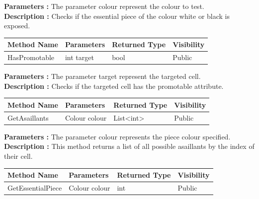 \documentclass[12pt]{article}
\begin{document}
\textbf{Parameters :} The parameter colour represent the colour
to test.
\\

\textbf{Description :} Checks if the essential piece of the colour white or black
is exposed.

\begin{table}[H]
    \begin{tabular}{|l|l|l|l|}
    \hline
    \rowcolor[HTML]{EFEFEF} 
    \cellcolor[HTML]{EFEFEF}\textbf{Method Name} & \textbf{Parameters}     & \textbf{Returned Type} & \textbf{Visibility} \\ \hline
    HasPromotable                                & int target              & bool                   & Public              \\ \hline
    \end{tabular}
\end{table}

\textbf{Parameters :} The parameter target represent the targeted cell.
\\

\textbf{Description :} Checks if the targeted cell has the promotable attribute.

\begin{table}[H]
    \begin{tabular}{|l|l|l|l|}
    \hline
    \rowcolor[HTML]{EFEFEF} 
    \cellcolor[HTML]{EFEFEF}\textbf{Method Name} & \textbf{Parameters}     & \textbf{Returned Type} & \textbf{Visibility} \\ \hline
    GetAsaillants                                & Colour colour           & List<int>                   & Public              \\ \hline
    \end{tabular}
\end{table}

\textbf{Parameters :} The parameter colour represents the piece colour specified.
\textbf{Description :} This method returns a list of all possible asaillants by the index of their cell.

\begin{table}[H]
    \begin{tabular}{|l|l|l|l|}
    \hline
    \rowcolor[HTML]{EFEFEF} 
    \cellcolor[HTML]{EFEFEF}\textbf{Method Name} & \textbf{Parameters}     & \textbf{Returned Type} & \textbf{Visibility} \\ \hline
    GetEssentialPiece                            & Colour colour           & int                   & Public              \\ \hline
    \end{tabular}
\end{table}
\end{document}
